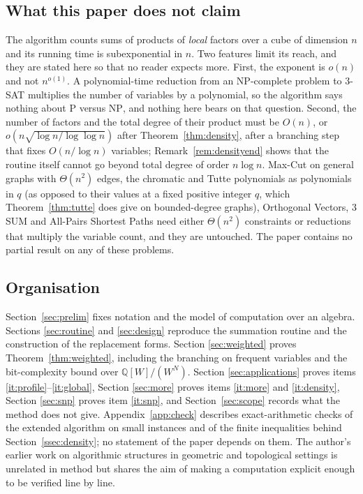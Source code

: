 \documentclass[11pt,reqno]{amsart}
\numberwithin{equation}{section}
\theoremstyle{plain}
\theoremstyle{definition}
\theoremstyle{remark}
\newcommand{\Q}{\mathbb{Q}}
\begin{document}
\subsection{What this paper does not claim}
The algorithm counts sums of products of \emph{local} factors over a cube of
dimension $n$ and its running time is subexponential in $n$. Two features limit
its reach, and they are stated here so that no reader expects more.
First, the exponent is $o(n)$ and not $n^{o(1)}$. A polynomial-time reduction
from an NP-complete problem to $3$-SAT multiplies the number of variables by a
polynomial, so the algorithm says nothing about $\mathrm{P}$ versus
$\mathrm{NP}$, and nothing here bears on that question. Second, the number of
factors and the total degree of their product must be $O(n)$, or
$o(n\sqrt{\log n/\log\log n})$ after Theorem~\ref{thm:density}, after a branching
step that fixes $O(n/\log n)$ variables; Remark~\ref{rem:densityend} shows that the
routine itself cannot go beyond total degree of order $n\log n$. Max-Cut on general
graphs with $\Theta(n^2)$ edges, the chromatic and Tutte
polynomials as polynomials in $q$ (as opposed to their values at a fixed
positive integer $q$, which Theorem~\ref{thm:tutte} does give on bounded-degree
graphs), Orthogonal Vectors, $3$SUM and All-Pairs Shortest Paths need either
$\Theta(n^2)$ constraints or reductions that multiply the variable count, and
they are untouched. The paper contains no partial result on any of these
problems.

\subsection{Organisation}
Section~\ref{sec:prelim} fixes notation and the model of computation over an
algebra. Sections \ref{sec:routine} and \ref{sec:design} reproduce the
summation routine and the construction of the replacement forms. Section
\ref{sec:weighted} proves Theorem~\ref{thm:weighted}, including the branching on
frequent variables and the bit-complexity bound over $\Q[W]/(W^N)$. Section
\ref{sec:applications} proves items \ref{it:profile}--\ref{it:global}, Section
\ref{sec:more} proves items \ref{it:more} and \ref{it:density}, Section
\ref{sec:snp} proves item \ref{it:snp}, and Section~\ref{sec:scope} records what
the method does not give. Appendix~\ref{app:check} describes exact-arithmetic
checks of the extended algorithm on small instances and of the finite inequalities
behind Section~\ref{ssec:density}; no statement of the paper depends on them. The author's earlier work on algorithmic structures in geometric and
topological settings \cite{Bha26a,Bha26b,Bha26c} is unrelated in method but
shares the aim of making a computation explicit enough to be verified line by
line.
\end{document}
